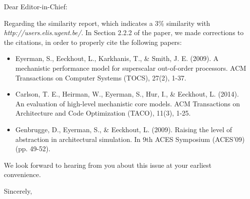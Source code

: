 \documentclass{letter}
\begin{document}
\begin{letter}{}


\opening{Dear Editor-in-Chief:}


Regarding the similarity report, which indicates a 3\% similarity with \emph{http://users.elis.ugent.be/}. In Section 2.2.2 of the paper, we made corrections to the citations, in order to properly cite the following papers: 
\begin{itemize}
    \item Eyerman, S., Eeckhout, L., Karkhanis, T., \& Smith, J. E. (2009). A mechanistic performance model for superscalar out-of-order processors. ACM Transactions on Computer Systems (TOCS), 27(2), 1-37.
     
    \item Carlson, T. E., Heirman, W., Eyerman, S., Hur, I., \& Eeckhout, L. (2014). An evaluation of high-level mechanistic core models. ACM Transactions on Architecture and Code Optimization (TACO), 11(3), 1-25.
    
    \item Genbrugge, D., Eyerman, S., \& Eeckhout, L. (2009). Raising the level of abstraction in architectural simulation. In 9th ACES Symposium (ACES'09) (pp. 49-52).
\end{itemize}
 


We look forward to hearing from you about this issue at your earliest convenience.

\closing{Sincerely,}

\end{letter}
\end{document}

